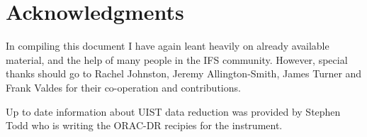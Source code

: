 \documentclass[twoside,11pt]{article}
\newcommand{\htmladdnormallink}[2]{#1}
\newcommand{\xlabel}[1]{}
\begin{document}
\section*{\xlabel{sc16_acks}Acknowledgments\label{sc16_acks}}

In compiling this document I have again leant heavily on already available material, and the help of many people in the IFS community. However, special thanks should go to \htmladdnormallink{Rachel Johnston}{http://www.ast.cam.ac.uk/~raj/}, \htmladdnormallink{Jeremy Allington-Smith}{http://star-www.dur.ac.uk:80/~jra/}, \htmladdnormallink{James Turner}{mailto:J.E.H.Turner@durham.ac.uk} and \htmladdnormallink{Frank Valdes}{http://www.noao.edu/noao/scistaff/valdes.html} for their co-operation and contributions. 

Up to date information about UIST data reduction was provided by \htmladdnormallink{Stephen Todd}{http://intra.roe.ac.uk/ifa/people/spt.html} who is writing the ORAC-DR recipies for the instrument.
\end{document}
